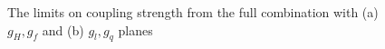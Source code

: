 \begin{figure}[ht]
	\centering
	\caption{The limits on coupling strength from the full combination with (a) {$g_H, g_f$} and (b) {$g_l, g_q$} planes }
	\label{Fig:limit_coupling}
\end{figure}
